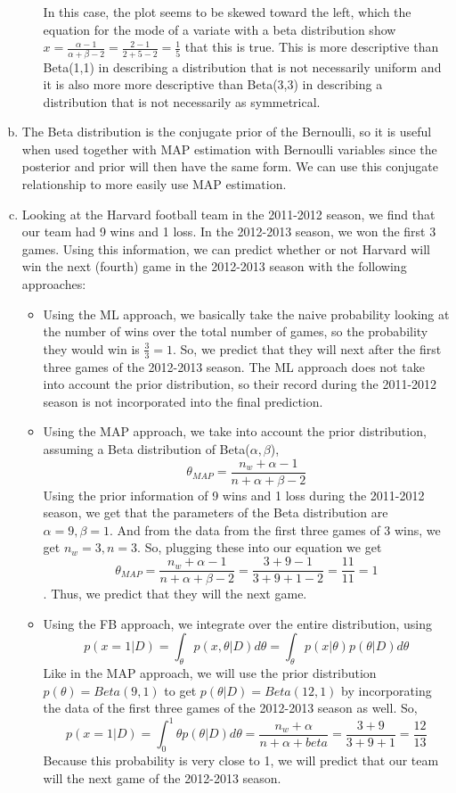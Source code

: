 \documentclass[11pt]{article}
\begin{document}
\begin{enumerate}[a.]
\begin{itemize}
In this case, the plot seems to be skewed toward the left, which the equation for the mode of a variate with a beta distribution show $x = \frac{\alpha - 1}{\alpha + \beta - 2}=\frac{2-1}{2+5-2}=\frac{1}{5}$ that this is true. This is more descriptive than Beta(1,1) in describing a distribution that is not necessarily uniform and it is also more more descriptive than Beta(3,3) in describing a distribution that is not necessarily as symmetrical.
\end{itemize}
\item The Beta distribution is the conjugate prior of the Bernoulli, so it is useful when used together with MAP estimation with Bernoulli variables since the posterior and prior will then have the same form. We can use this conjugate relationship to more easily use MAP estimation. 
\item Looking at the Harvard football team in the 2011-2012 season, we find that our team had 9 wins and 1 loss. In the 2012-2013 season, we won the first 3 games. Using this information, we can predict whether or not Harvard will win the next (fourth) game in the 2012-2013 season with the following approaches:
	\begin{itemize}
	\item Using the ML approach, we basically take the naive probability looking at the number of wins over the total number of games, so the probability they would win is $\frac{3}{3} = 1$. So, we predict that they will  next after the first three games of the 2012-2013 season. The ML approach does not take into account the prior distribution, so their record during the 2011-2012 season is not incorporated into the final prediction.
	\item Using the MAP approach, we take into account the prior distribution, assuming a Beta distribution of Beta($\alpha,\beta$), \[\theta_{MAP} = \frac{n_w+\alpha-1}{n+\alpha+\beta-2}\] Using the prior information of 9 wins and 1 loss during the 2011-2012 season, we get that the parameters of the Beta distribution are $\alpha = 9, \beta = 1$. And from the data from the first three games of 3 wins, we get $n_w = 3, n = 3$. So, plugging these into our equation we get 
	\[\theta_{MAP} = \frac{n_w+\alpha-1}{n+\alpha+\beta-2}=\frac{3+9-1}{3+9+1-2}=\frac{11}{11} = 1\]. Thus, we predict that they will  the next game.
	\item Using the FB approach, we integrate over the entire distribution, using $$p(x = 1|D) = \int_\theta p(x, \theta|D) d\theta = \int_\theta p(x|\theta)p(\theta|D)d\theta$$ Like in the MAP approach, we will use the prior distribution $p(\theta) = Beta(9, 1)$ to get $p(\theta | D) = Beta(12, 1)$ by incorporating the data of the first three games of the 2012-2013 season as well. So,
$$p(x = 1 | D) = \int_0^1 \theta p(\theta|D) d\theta = \frac{n_w + \alpha}{n + \alpha + beta} = \frac{3 + 9}{3 + 9 + 1} = \frac{12}{13}$$ Because this probability is very close to 1, we will predict that our team will  the next game of the 2012-2013 season.
	\end{itemize}
\end{enumerate}
\end{document}
